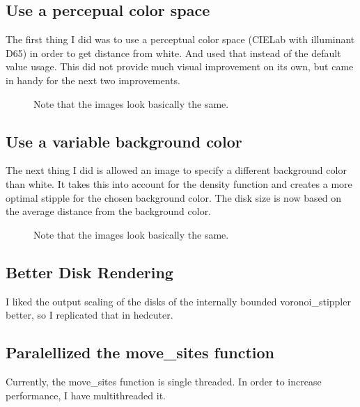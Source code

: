 \documentclass[11pt]{article}
\begin{document}
\subsection{Use a percepual color space}
The first thing I did was to use a perceptual color space (CIELab with
illuminant D65) in order to get distance from white. And used that
instead of the default value usage. This did not provide much visual
improvement on its own, but came in handy for the next two improvements.

\begin{figure}[H]
  \centering
  \begin{minipage}{.5\textwidth}
    \centering
    
  \end{minipage}%
  \begin{minipage}{.5\textwidth}
    \centering
    
  \end{minipage}
  \caption{Note that the images look basically the same.}
\end{figure}

\subsection{Use a variable background color}
The next thing I did is allowed an image to specify a different
background color than white. It takes this into account for the
density function and creates a more optimal stipple for the chosen
background color. The disk size is now based on the average distance
from the background color.

\begin{figure}[H]
  \centering
  \begin{minipage}{.5\textwidth}
    \centering
    
  \end{minipage}%
  \begin{minipage}{.5\textwidth}
    \centering
    
  \end{minipage}
  \caption{Note that the images look basically the same.}
\end{figure}

\subsection{Better Disk Rendering}
I liked the output scaling of the disks of the internally bounded
voronoi\_stippler better, so I replicated that in hedcuter.


\subsection{Paralellized the move\_sites function}
Currently, the move\_sites function is single threaded. In order to
increase performance, I have multithreaded it.



\end{document}
